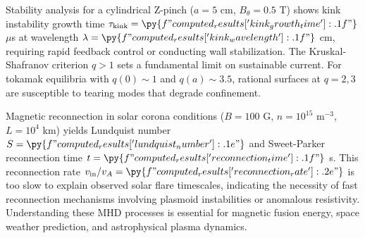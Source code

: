 \documentclass[11pt,a4paper]{article}
\begin{document}
Stability analysis for a cylindrical Z-pinch ($a = 5$ cm, $B_\theta = 0.5$ T) shows kink instability growth time $\tau_{\text{kink}} = \py{f"{computed_results['kink_growth_time']:.1f}"}$ $\mu$s at wavelength $\lambda = \py{f"{computed_results['kink_wavelength']:.1f}"}$ cm, requiring rapid feedback control or conducting wall stabilization. The Kruskal-Shafranov criterion $q > 1$ sets a fundamental limit on sustainable current. For tokamak equilibria with $q(0) \sim 1$ and $q(a) \sim 3.5$, rational surfaces at $q = 2, 3$ are susceptible to tearing modes that degrade confinement.

Magnetic reconnection in solar corona conditions ($B = 100$ G, $n = 10^{15}$ m$^{-3}$, $L = 10^4$ km) yields Lundquist number $S = \py{f"{computed_results['lundquist_number']:.1e}"}$ and Sweet-Parker reconnection time $t = \py{f"{computed_results['reconnection_time']:.1f}"}$ s. This reconnection rate $v_{\text{in}}/v_A = \py{f"{computed_results['reconnection_rate']:.2e}"}$ is too slow to explain observed solar flare timescales, indicating the necessity of fast reconnection mechanisms involving plasmoid instabilities or anomalous resistivity. Understanding these MHD processes is essential for magnetic fusion energy, space weather prediction, and astrophysical plasma dynamics.
\end{document}
